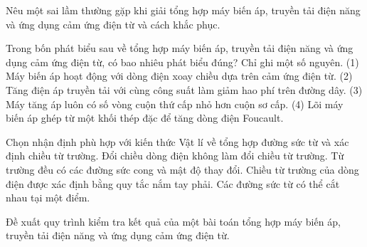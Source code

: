\begin{bt}
Nêu một sai lầm thường gặp khi giải tổng hợp máy biến áp, truyền tải điện năng và ứng dụng cảm ứng điện từ và cách khắc phục.
\end{bt}

\begin{ex}
Trong bốn phát biểu sau về tổng hợp máy biến áp, truyền tải điện năng và ứng dụng cảm ứng điện từ, có bao nhiêu phát biểu đúng? Chỉ ghi một số nguyên. (1) Máy biến áp hoạt động với dòng điện xoay chiều dựa trên cảm ứng điện từ. (2) Tăng điện áp truyền tải với cùng công suất làm giảm hao phí trên đường dây. (3) Máy tăng áp luôn có số vòng cuộn thứ cấp nhỏ hơn cuộn sơ cấp. (4) Lõi máy biến áp ghép từ một khối thép đặc để tăng dòng điện Foucault.
\end{ex}

\begin{ex}
Chọn nhận định phù hợp với kiến thức Vật lí về tổng hợp đường sức từ và xác định chiều từ trường.
\choice
{Đổi chiều dòng điện không làm đổi chiều từ trường.}
{Từ trường đều có các đường sức cong và mật độ thay đổi.}
{\True Chiều từ trường của dòng điện được xác định bằng quy tắc nắm tay phải.}
{Các đường sức từ có thể cắt nhau tại một điểm.}
\end{ex}

\begin{bt}
Đề xuất quy trình kiểm tra kết quả của một bài toán tổng hợp máy biến áp, truyền tải điện năng và ứng dụng cảm ứng điện từ.
\end{bt}

